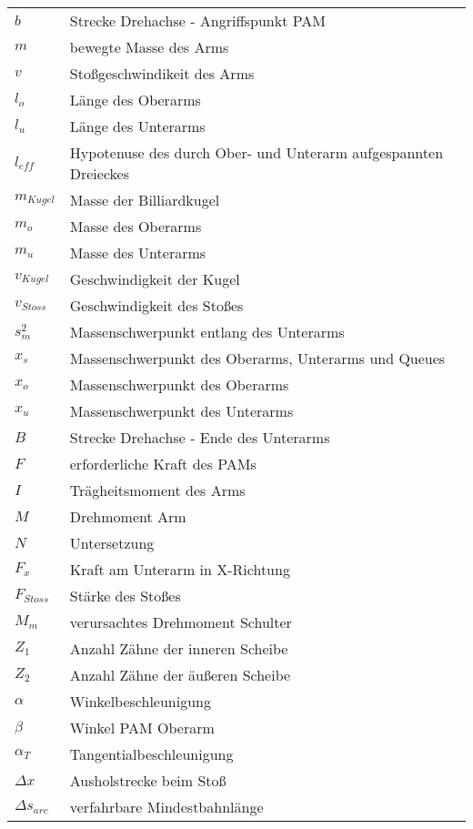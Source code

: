     \begin{table}[h]
        \begin{tabular}{@{}ll@{}}%
            \(b\) & Strecke Drehachse - Angriffspunkt PAM\\
            \(m\) & bewegte Masse des Arms\\
            \(v\) & Stoßgeschwindikeit des Arms\\
            
            \(l_o\) & Länge des Oberarms\\
            \(l_u\) & Länge des Unterarms\\
            \(l_{eff}\) & Hypotenuse des durch Ober- und Unterarm aufgespannten Dreieckes\\
            \(m_{Kugel}\) & Masse der Billiardkugel\\
            \(m_o\) & Masse des Oberarms\\
            \(m_u\) & Masse des Unterarms\\
            \(v_{Kugel}\) & Geschwindigkeit der Kugel\\
            \(v_{Stoss}\) & Geschwindigkeit des Stoßes\\
            \(s^2_{m}\) & Massenschwerpunkt entlang des Unterarms\\
            \(x_s\) & Massenschwerpunkt des Oberarms, Unterarms und Queues\\
            \(x_o\) & Massenschwerpunkt des Oberarms\\
            \(x_u\) & Massenschwerpunkt des Unterarms\\
            
            \(B\) & Strecke Drehachse - Ende des Unterarms\\
            \(F\) & erforderliche Kraft des PAMs\\
            \(I\) & Trägheitsmoment des Arms\\
            \(M\) & Drehmoment Arm\\
            \(N\) & Untersetzung\\
            
            \(F_{x}\) & Kraft am Unterarm in X-Richtung\\
            \(F_{Stoss}\) & Stärke des Stoßes\\
            \(M_m\) & verursachtes Drehmoment Schulter\\
            \(Z_1\) & Anzahl Zähne der inneren Scheibe\\
            \(Z_2\) & Anzahl Zähne der äußeren Scheibe\\
            
            \(\alpha\) & Winkelbeschleunigung\\
            \(\beta\) & Winkel PAM Oberarm\\
            
            \(\alpha_T\) & Tangentialbeschleunigung\\
            \(\Delta x\) & Ausholstrecke beim Stoß\\
            \(\Delta s_{arc}\) & verfahrbare Mindestbahnlänge\\
    \end{tabular}\label{tab:glossar}
    \end{table}